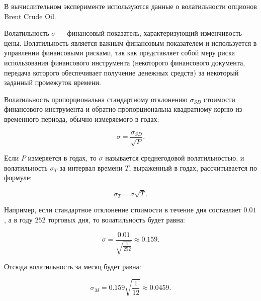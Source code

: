 \documentclass[12pt,a4paper]{amsart}
\begin{document}
В вычислительном эксперименте используются данные о волатильности опционов
Brent Crude Oil.

Волатильность $\sigma$ --- финансовый показатель, характеризующий
изменчивость цены. Волатильность является важным финансовым показателем
и используется в управлении финансовыми рисками, так как представляет собой
меру риска использования финансового инструмента (некоторого финансового
документа, передача которого обеспечивает получение денежных средств) за
некоторый заданный промежуток времени.

Волатильность пропорциональна стандартному отклонению $\sigma_{SD}$ стоимости
финансового инструмента и обратно пропорциональна квадратному корню из
временного периода, обычно измеряемого в годах:

\[
\sigma = \frac{\sigma_{SD}}{\sqrt{P}}.
\]

Если $P$ измеряется в годах, то $\sigma$ называется среднегодовой
волатильностью, и волатильность $\sigma_T$ за интервал времени $T$,
выраженный в годах, рассчитывается по формуле:

\[
\sigma_T = \sigma \sqrt{T}.
\]

Например, если стандартное отклонение стоимости в течение дня составляет
$0.01$, а в году $252$ торговых дня, то волатильность будет равна:

\[
\sigma = \frac{0.01}{\sqrt{\frac{1}{252}}} \approx 0.159.
\]

Отсюда волатильность за месяц будет равна:

\[
\sigma_M = 0.159 \sqrt{\frac{1}{12}} \approx 0.0459.
\]


\extrasrussian

\end{document}

